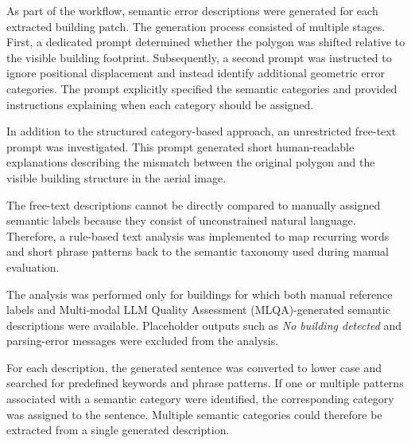 As part of the workflow, semantic error descriptions were generated for each extracted building patch. The generation process consisted of multiple stages. First, a dedicated prompt determined whether the polygon was shifted relative to the visible building footprint. Subsequently, a second prompt was instructed to ignore positional displacement and instead identify additional geometric error categories. The prompt explicitly specified the semantic categories and provided instructions explaining when each category should be assigned.

In addition to the structured category-based approach, an unrestricted free-text prompt was investigated. This prompt generated short human-readable explanations describing the mismatch between the original polygon and the visible building structure in the aerial image.

The free-text descriptions cannot be directly compared to manually assigned semantic labels because they consist of unconstrained natural language. Therefore, a rule-based text analysis was implemented to map recurring words and short phrase patterns back to the semantic taxonomy used during manual evaluation.

The analysis was performed only for buildings for which both manual reference labels and Multi-modal LLM Quality Assessment (MLQA)-generated semantic descriptions were available. Placeholder outputs such as \textit{No building detected} and parsing-error messages were excluded from the analysis.

For each description, the generated sentence was converted to lower case and searched for predefined keywords and phrase patterns. If one or multiple patterns associated with a semantic category were identified, the corresponding category was assigned to the sentence. Multiple semantic categories could therefore be extracted from a single generated description.

